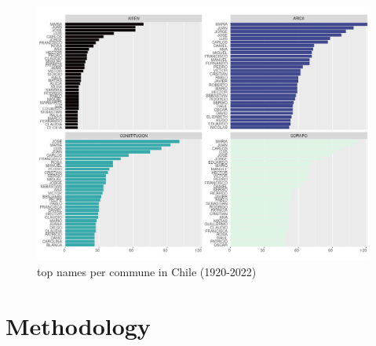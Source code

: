 \begin{figure}[H]
    \centering
    \includegraphics[width=13cm]{plot/top_nombre_comuna2.png}
    \caption{top names per commune in Chile (1920-2022)}
    \label{}
\end{figure}


\section{Methodology}





